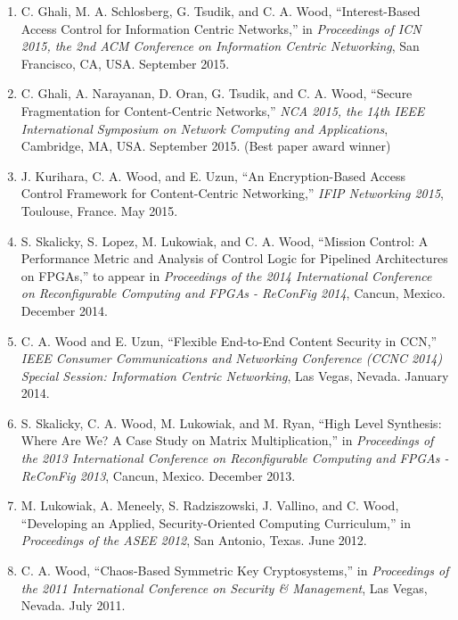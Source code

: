 \documentclass[10pt]{res} %
\begin{document}
\begin{resume}
\begin{enumerate}[C-1.]
\item C. Ghali, M. A. Schlosberg, G. Tsudik, and C. A. Wood, ``Interest-Based Access Control for Information Centric Networks,'' in \emph{Proceedings of ICN 2015, the 2nd ACM Conference on Information Centric Networking}, San Francisco, CA, USA. September 2015.

\item C. Ghali, A. Narayanan, D. Oran, G. Tsudik, and C. A. Wood, ``Secure Fragmentation for Content-Centric Networks,'' \emph{NCA 2015, the 14th IEEE International Symposium on Network Computing and Applications}, Cambridge, MA, USA. September 2015. {\color{red} (Best paper award winner)}

\item J. Kurihara, C. A. Wood, and E. Uzun, ``An Encryption-Based Access Control Framework for Content-Centric Networking,'' \emph{IFIP Networking 2015}, Toulouse, France. May 2015.

\item S. Skalicky, S. Lopez, M. Lukowiak, and C. A. Wood, ``Mission Control: A Performance Metric and Analysis of Control Logic for Pipelined Architectures on FPGAs,'' to appear in {\it Proceedings of the 2014 International Conference on Reconfigurable Computing and FPGAs - ReConFig 2014}, Cancun, Mexico. December 2014.

\item C. A. Wood and E. Uzun, ``Flexible End-to-End Content Security in CCN,'' \emph{IEEE Consumer Communications and Networking Conference (CCNC 2014) Special Session: Information Centric Networking}, Las Vegas, Nevada. January 2014.

\item S. Skalicky, C. A. Wood, M. Lukowiak, and M. Ryan, ``High Level Synthesis: Where Are We? A Case Study on Matrix Multiplication,'' in {\it Proceedings of the 2013 International Conference on Reconfigurable Computing and FPGAs - ReConFig 2013}, Cancun, Mexico. December 2013.

\item M. Lukowiak, A. Meneely, S. Radziszowski, J. Vallino, and C. Wood, ``Developing an Applied, Security-Oriented Computing Curriculum,'' in {\it Proceedings of the ASEE 2012}, San Antonio, Texas. June 2012.

\item C. A. Wood, ``Chaos-Based Symmetric Key Cryptosystems,'' in {\it Proceedings of the 2011 International Conference on Security \& Management}, Las Vegas, Nevada. July 2011.


\end{enumerate}
\end{resume}
\end{document}
